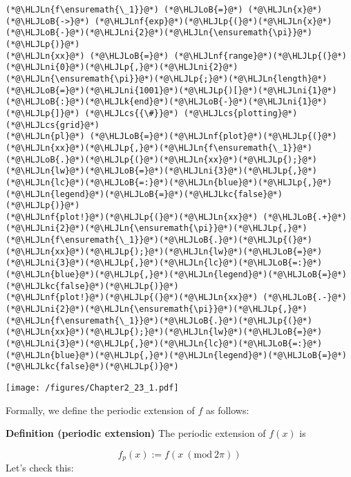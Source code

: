 \documentclass[12pt,landscape]{article}
\newcommand{\HLJLk}[1]{\textcolor[RGB]{148,91,176}{\textbf{#1}}}
\newcommand{\HLJLkc}[1]{\textcolor[RGB]{59,151,46}{\textit{#1}}}
\newcommand{\HLJLn}[1]{#1}
\newcommand{\HLJLnf}[1]{\textcolor[RGB]{66,102,213}{#1}}
\newcommand{\HLJLni}[1]{\textcolor[RGB]{59,151,46}{#1}}
\newcommand{\HLJLoB}[1]{\textcolor[RGB]{102,102,102}{\textbf{#1}}}
\newcommand{\HLJLp}[1]{#1}
\newcommand{\HLJLcs}[1]{\textcolor[RGB]{153,153,119}{\textit{#1}}}
\begin{document}
{\begin{lstlisting}
(*@\HLJLn{f\ensuremath{\_1}}@*) (*@\HLJLoB{=}@*) (*@\HLJLn{x}@*) (*@\HLJLoB{->}@*) (*@\HLJLnf{exp}@*)(*@\HLJLp{(}@*)(*@\HLJLn{x}@*)(*@\HLJLoB{-}@*)(*@\HLJLni{2}@*)(*@\HLJLn{\ensuremath{\pi}}@*)(*@\HLJLp{)}@*)
(*@\HLJLn{xx}@*) (*@\HLJLoB{=}@*) (*@\HLJLnf{range}@*)(*@\HLJLp{(}@*)(*@\HLJLni{0}@*)(*@\HLJLp{,}@*)(*@\HLJLni{2}@*)(*@\HLJLn{\ensuremath{\pi}}@*)(*@\HLJLp{;}@*)(*@\HLJLn{length}@*)(*@\HLJLoB{=}@*)(*@\HLJLni{1001}@*)(*@\HLJLp{)[}@*)(*@\HLJLni{1}@*)(*@\HLJLoB{:}@*)(*@\HLJLk{end}@*)(*@\HLJLoB{-}@*)(*@\HLJLni{1}@*)(*@\HLJLp{]}@*) (*@\HLJLcs{{\#}}@*) (*@\HLJLcs{plotting}@*) (*@\HLJLcs{grid}@*)
(*@\HLJLn{pl}@*) (*@\HLJLoB{=}@*)(*@\HLJLnf{plot}@*)(*@\HLJLp{(}@*)(*@\HLJLn{xx}@*)(*@\HLJLp{,}@*)(*@\HLJLn{f\ensuremath{\_1}}@*)(*@\HLJLoB{.}@*)(*@\HLJLp{(}@*)(*@\HLJLn{xx}@*)(*@\HLJLp{);}@*)(*@\HLJLn{lw}@*)(*@\HLJLoB{=}@*)(*@\HLJLni{3}@*)(*@\HLJLp{,}@*)(*@\HLJLn{lc}@*)(*@\HLJLoB{=:}@*)(*@\HLJLn{blue}@*)(*@\HLJLp{,}@*)(*@\HLJLn{legend}@*)(*@\HLJLoB{=}@*)(*@\HLJLkc{false}@*)(*@\HLJLp{)}@*)
(*@\HLJLnf{plot!}@*)(*@\HLJLp{(}@*)(*@\HLJLn{xx}@*) (*@\HLJLoB{.+}@*) (*@\HLJLni{2}@*)(*@\HLJLn{\ensuremath{\pi}}@*)(*@\HLJLp{,}@*)(*@\HLJLn{f\ensuremath{\_1}}@*)(*@\HLJLoB{.}@*)(*@\HLJLp{(}@*)(*@\HLJLn{xx}@*)(*@\HLJLp{);}@*)(*@\HLJLn{lw}@*)(*@\HLJLoB{=}@*)(*@\HLJLni{3}@*)(*@\HLJLp{,}@*)(*@\HLJLn{lc}@*)(*@\HLJLoB{=:}@*)(*@\HLJLn{blue}@*)(*@\HLJLp{,}@*)(*@\HLJLn{legend}@*)(*@\HLJLoB{=}@*)(*@\HLJLkc{false}@*)(*@\HLJLp{)}@*)
(*@\HLJLnf{plot!}@*)(*@\HLJLp{(}@*)(*@\HLJLn{xx}@*) (*@\HLJLoB{.-}@*) (*@\HLJLni{2}@*)(*@\HLJLn{\ensuremath{\pi}}@*)(*@\HLJLp{,}@*)(*@\HLJLn{f\ensuremath{\_1}}@*)(*@\HLJLoB{.}@*)(*@\HLJLp{(}@*)(*@\HLJLn{xx}@*)(*@\HLJLp{);}@*)(*@\HLJLn{lw}@*)(*@\HLJLoB{=}@*)(*@\HLJLni{3}@*)(*@\HLJLp{,}@*)(*@\HLJLn{lc}@*)(*@\HLJLoB{=:}@*)(*@\HLJLn{blue}@*)(*@\HLJLp{,}@*)(*@\HLJLn{legend}@*)(*@\HLJLoB{=}@*)(*@\HLJLkc{false}@*)(*@\HLJLp{)}@*)
\end{lstlisting}

\texttt{[image: /figures/Chapter2\_23\_1.pdf]}

Formally, we define the periodic extension of $f$ as follows:

\textbf{Definition (periodic extension)} The periodic extension of $f(x)$ is

\[
f_p(x) :=  f(x \: (\mathrm{mod}\: 2\pi))
\]
Let's check this:


}
\end{document}
